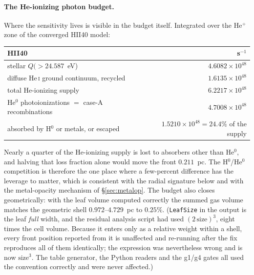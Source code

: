 \documentclass[english,a4paper]{my_memo}
\newcommand{\code}[1]{\texttt{#1}}
\begin{document}
\paragraph{The He-ionizing photon budget.}  Where the sensitivity lives is
visible in the budget itself.  Integrated over the He$^+$ zone of the
converged HII40 model:
\begin{center}\small
\begin{tabular}{@{}lr@{}}
\toprule
HII40 & s$^{-1}$ \\
\midrule
stellar $Q({>}24.587$~eV) & $4.6082{\times}10^{48}$ \\
diffuse He\,\textsc{i} ground continuum, recycled & $1.6135{\times}10^{48}$ \\
total He-ionizing supply & $6.2217{\times}10^{48}$ \\
He$^0$ photoionizations $=$ case-A recombinations & $4.7008{\times}10^{48}$ \\
absorbed by H$^0$ or metals, or escaped
  & $1.5210{\times}10^{48} = 24.4\%$ of the supply \\
\bottomrule
\end{tabular}
\end{center}
Nearly a quarter of the He-ionizing supply is lost to absorbers other than
He$^0$, and halving that loss fraction alone would move the front
$0.211$~pc.  The H$^0$/He$^0$ competition is therefore the one place where a
few-percent difference has the leverage to matter, which is consistent with
the radial signature below and with the metal-opacity mechanism of
\S\ref{sec:metalop}.  The budget also closes geometrically: with the leaf
volume computed correctly the summed gas volume matches the geometric shell
$0.972$--$4.729$~pc to $0.25\%$.  (\code{LeafSize} in the output is the leaf
\emph{full} width, and the residual analysis script had used
$(2\,\mathrm{size})^3$, eight times the cell volume.  Because it enters only
as a relative weight within a shell, every front position reported from it is
unaffected and re-running after the fix reproduces all of them identically;
the expression was nevertheless wrong and is now $\mathrm{size}^3$.  The
table generator, the Python readers and the g1/g4 gates all used the
convention correctly and were never affected.)
\end{document}
